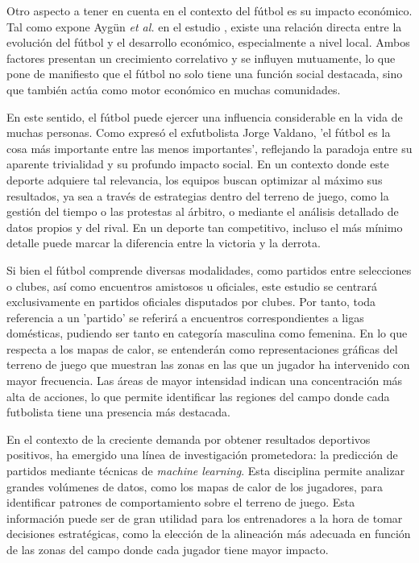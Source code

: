 Otro aspecto a tener en cuenta en el contexto del fútbol es su impacto económico. Tal como expone Aygün \textit{et al.} en el estudio \cite{economy-football}, existe una relación directa entre la evolución del fútbol y el desarrollo económico, especialmente a nivel local. Ambos factores presentan un crecimiento correlativo y se influyen mutuamente, lo que pone de manifiesto que el fútbol no solo tiene una función social destacada, sino que también actúa como motor económico en muchas comunidades.

En este sentido, el fútbol puede ejercer una influencia considerable en la vida de muchas personas. Como expresó el exfutbolista Jorge Valdano, 'el fútbol es la cosa más importante entre las menos importantes', reflejando la paradoja entre su aparente trivialidad y su profundo impacto social. En un contexto donde este deporte adquiere tal relevancia, los equipos buscan optimizar al máximo sus resultados, ya sea a través de estrategias dentro del terreno de juego, como la gestión del tiempo o las protestas al árbitro, o mediante el análisis detallado de datos propios y del rival. En un deporte tan competitivo, incluso el más mínimo detalle puede marcar la diferencia entre la victoria y la derrota.

Si bien el fútbol comprende diversas modalidades, como partidos entre selecciones o clubes, así como encuentros amistosos u oficiales, este estudio se centrará exclusivamente en partidos oficiales disputados por clubes. Por tanto, toda referencia a un 'partido' se referirá a encuentros correspondientes a ligas domésticas, pudiendo ser tanto en categoría masculina como femenina. En lo que respecta a los mapas de calor, se entenderán como representaciones gráficas del terreno de juego que muestran las zonas en las que un jugador ha intervenido con mayor frecuencia. Las áreas de mayor intensidad indican una concentración más alta de acciones, lo que permite identificar las regiones del campo donde cada futbolista tiene una presencia más destacada.

En el contexto de la creciente demanda por obtener resultados deportivos positivos, ha emergido una línea de investigación prometedora: la predicción de partidos mediante técnicas de \textit{machine learning}. Esta disciplina permite analizar grandes volúmenes de datos, como los mapas de calor de los jugadores, para identificar patrones de comportamiento sobre el terreno de juego. Esta información puede ser de gran utilidad para los entrenadores a la hora de tomar decisiones estratégicas, como la elección de la alineación más adecuada en función de las zonas del campo donde cada jugador tiene mayor impacto.

